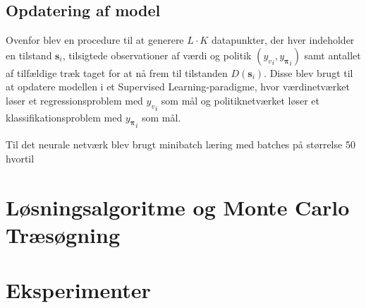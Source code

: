 \documentclass[../main.tex]{subfiles}
\begin{document}
\subsection*{Opdatering af model}

Ovenfor blev en procedure til at generere \(L\cdot K\) datapunkter, der hver indeholder en tilstand \(\mathbf s_i\), tilsigtede observationer af værdi og politik \(\left({y_{v}}_i, {y_{\bm \pi }}_i \right)\) samt antallet af tilfældige træk taget for at nå frem til tilstanden \(D(\mathbf s_i)\). Disse blev  brugt til at opdatere modellen i et Supervised Learning-paradigme, hvor værdinetværket løser et regressionsproblem med \({y_{v}}_i\) som mål og politiknetværket løser et klassifikationsproblem med \({y_{\bm \pi }}_i\) som mål. 

Til det neurale netværk blev brugt minibatch læring med batches på størrelse 50 hvortil 





\section{Løsningsalgoritme og Monte Carlo Træsøgning}

\section{Eksperimenter}
\end{document}
